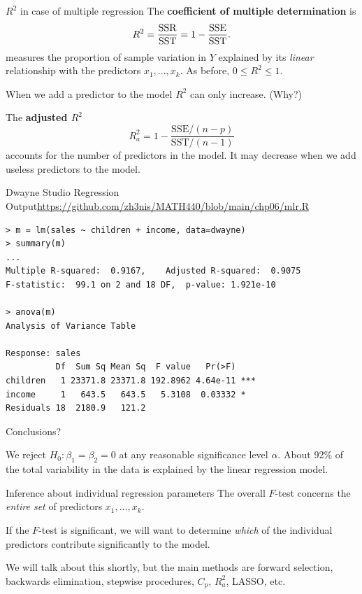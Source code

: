 \documentclass{beamer}
\begin{document}
\begin{frame}{$R^2$ in case of multiple regression}
The \textbf{coefficient of multiple determination} is
$$
R^2=\frac{\rm SSR}{\rm SST}=1-\frac{\rm SSE}{\rm SST}.
$$
measures the proportion of sample variation in $Y$ explained by its \textit{linear} relationship with the predictors $x_1,\ldots,x_k$. As before, $0\le R^2\le1$.
\vspace{10pt}

\pause When we add a predictor to the model $R^2$ can only increase. (Why?)
\vspace{10pt}

\pause The \textbf{adjusted $R^2$}
$$
R_a^2=1-\frac{\mathrm{SSE}/(n-p)}{\mathrm{SST}/(n-1)}
$$
accounts for the number of predictors in the model. It may decrease when we add useless predictors to the model.
\end{frame}

\begin{frame}[fragile]{Dwayne Studio Regression Output}{\url{https://github.com/zh3nis/MATH440/blob/main/chp06/mlr.R}}
\begin{footnotesize}
\begin{verbatim}
> m = lm(sales ~ children + income, data=dwayne)
> summary(m)
...
Multiple R-squared:  0.9167,	Adjusted R-squared:  0.9075 
F-statistic:  99.1 on 2 and 18 DF,  p-value: 1.921e-10

> anova(m)
Analysis of Variance Table

Response: sales
          Df  Sum Sq Mean Sq  F value   Pr(>F)    
children   1 23371.8 23371.8 192.8962 4.64e-11 ***
income     1   643.5   643.5   5.3108  0.03332 *  
Residuals 18  2180.9   121.2
\end{verbatim}
\end{footnotesize}

Conclusions?

\pause
We reject $H_0:\beta_1=\beta_2=0$ at any reasonable significance level $\alpha$. About 92\% of the total variability in the data is explained by the linear regression model.
\end{frame}

\begin{frame}{Inference about individual regression parameters}
The overall $F$-test concerns the \textit{entire set} of predictors $x_1,\ldots,x_k$.
\vspace{10pt}

\pause If the $F$-test is significant, we will want to determine \textit{which} of the individual predictors contribute significantly to the model.
\vspace{10pt}

\pause We will talk about this shortly, but the main methods are forward selection, backwards elimination, stepwise procedures, $C_p$, $R_a^2$, LASSO, etc.
\end{frame}
\end{document}
